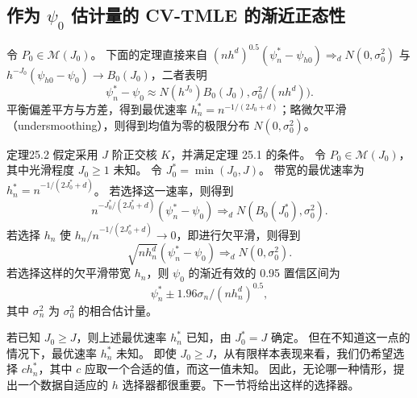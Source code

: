 \subsection{作为 \texorpdfstring{$\psi_0$}{ψ0} 估计量的 CV-TMLE 的渐近正态性}

令 $P_0\in\mathcal M(J_0)$。
下面的定理直接来自
$(nh^d)^{0.5}(\psi_n^*-\psi_{h0})\Rightarrow_dN(0,\sigma_0^2)$
与 $h^{-J_0}(\psi_{h0}-\psi_0)\to B_0(J_0)$，二者表明
\[
 \psi_n^*-\psi_0\approx
 N(h^{J_0})B_0(J_0),\sigma_0^2/(nh^d)).
\]
平衡偏差平方与方差，得到最优速率
$h_n^*=n^{-1/(2J_0+d)}$；略微欠平滑（undersmoothing），则得到均值为零的极限分布 $N(0,\sigma_0^2)$。

\begin{bookresult}{定理}{25.2}
假定采用 $J$ 阶正交核 $K$，并满足定理 25.1 的条件。
令 $P_0\in\mathcal M(J_0)$，其中光滑程度 $J_0\geq1$ 未知。
令 $J_0^*=\min(J_0,J)$。
带宽的最优速率为 $h_n^*=n^{-1/(2J_0^*+d)}$。
若选择这一速率，则得到
\[
 n^{-J_0^*/(2J_0^*+d)}(\psi_n^*-\psi_0)
 \Rightarrow_dN(B_0(J_0^*),\sigma_0^2).
\]
若选择 $h_n$ 使 $h_n/n^{-1/(2J_0^*+d)}\to0$，即进行欠平滑，则得到
\[
 \sqrt{nh_n^d}(\psi_n^*-\psi_0)\Rightarrow_dN(0,\sigma_0^2).
\]
若选择这样的欠平滑带宽 $h_n$，则 $\psi_0$ 的渐近有效的 0.95 置信区间为
\[
 \psi_n^*\pm1.96\sigma_n/(nh_n^d)^{0.5},
\]
其中 $\sigma_n^2$ 为 $\sigma_0^2$ 的相合估计量。
\end{bookresult}

若已知 $J_0\geq J$，则上述最优速率 $h_n^*$ 已知，由 $J_0^*=J$ 确定。
但在不知道这一点的情况下，最优速率 $h_n^*$ 未知。
即使 $J_0\geq J$，从有限样本表现来看，我们仍希望选择
$ch_n^*$，其中 $c$ 应取一个合适的值，而这一值未知。
因此，无论哪一种情形，提出一个数据自适应的 $h$ 选择器都很重要。下一节将给出这样的选择器。
